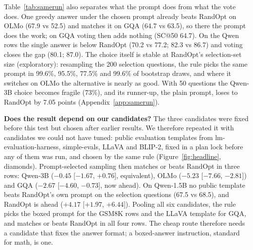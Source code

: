 \documentclass{article}
\makeatletter
\newcommand{\SC}{SC@50}
\makeatother
\begin{document}
Table~\ref{tab:samerun} also separates what the prompt does from what the vote does. One greedy answer under the
chosen prompt already beats RandOpt on OLMo (67.9 vs 52.5) and matches it on GQA (64.7 vs 63.5), so there the prompt
does the work; on GQA voting then adds nothing (\SC{} 64.7). On the Qwen rows the single answer is below RandOpt
(70.2 vs 77.2; 82.3 vs 86.7) and voting closes the gap (80.1; 87.0). The choice itself is stable at RandOpt's
selection-set size (exploratory): resampling the 200 selection questions, the rule picks the same prompt in 99.6\%,
95.5\%, 77.5\% and 99.6\% of bootstrap draws, and where it switches on OLMo the alternative is nearly as good. With 50
questions the Qwen-3B choice becomes fragile (73\%), and its runner-up, the plain prompt, loses to RandOpt by 7.05
points (Appendix~\ref{app:samerun}).

\textbf{Does the result depend on our candidates?} The three candidates were fixed before this test but chosen after
earlier results. We therefore repeated it with candidates we could not have tuned: public evaluation templates from
lm-evaluation-harness, simple-evals, LLaVA and BLIP-2, fixed in a plan lock before any of them was run, and chosen by
the same rule (Figure~\ref{fig:headline}, diamonds). Prompt-selected sampling then matches or beats RandOpt in three
rows: Qwen-3B ($-0.45$ [$-1.67$, $+0.76$], equivalent), OLMo ($-5.23$ [$-7.66$, $-2.81$]) and GQA ($-2.67$ [$-4.60$,
$-0.73$], now ahead). On Qwen-1.5B no public template beats RandOpt's own prompt on the selection questions (67.5 vs
68.5), and RandOpt is ahead ($+4.17$ [$+1.97$, $+6.44$]). Pooling all six candidates, the rule picks the boxed prompt
for the GSM8K rows and the LLaVA template for GQA, and matches or beats RandOpt in all four rows. The cheap route
therefore needs a candidate that fixes the answer format; a boxed-answer instruction, standard for math, is one.
\end{document}
